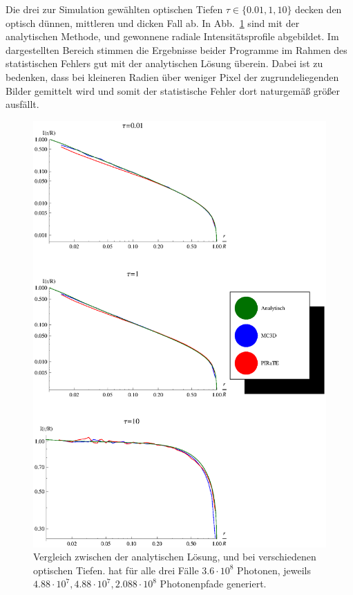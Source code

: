 	Die drei zur Simulation gewählten optischen Tiefen $\tau\in\{0.01,1,10\}$ decken den optisch dünnen, mittleren und dicken Fall ab.	In Abb.~\ref{fig:methodcomparisongraphics} sind mit der analytischen Methode, \mctd und \pirate gewonnene radiale Intensitätsprofile abgebildet.
	Im dargestellten Bereich stimmen die Ergebnisse beider Programme im Rahmen des statistischen Fehlers gut mit der analytischen Lösung überein. Dabei ist zu bedenken, dass bei kleineren Radien über weniger Pixel der zugrundeliegenden Bilder gemittelt wird und somit der statistische Fehler dort naturgemäß größer ausfällt.
		\begin{figure}
			\centering
			\includegraphics[height=1.0\textheight]{methodcomparisongraphics.eps}
			\caption{Vergleich zwischen der analytischen Lösung, \mctd und \pirate bei verschiedenen optischen Tiefen. \mctd hat für alle drei Fälle $3.6\cdot10^8$ Photonen, \pirate jeweils $4.88\cdot10^7,4.88\cdot10^7,2.088\cdot10^8$ Photonenpfade generiert.}
			\label{fig:methodcomparisongraphics}
		\end{figure}
	
